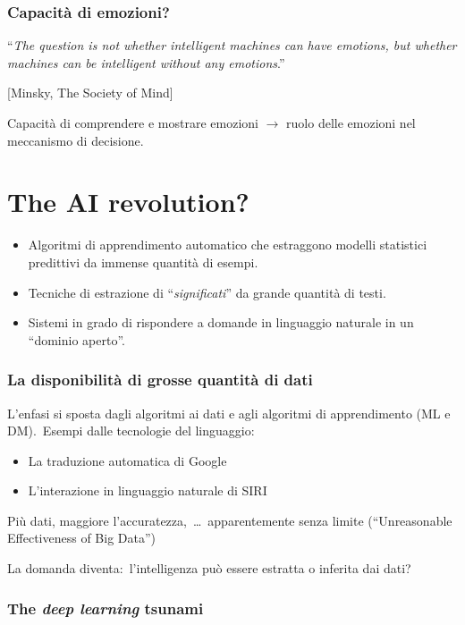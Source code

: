 \subsubsection{Capacità di emozioni?}

\begin{center}
	``\textit{The question is not whether intelligent machines can have emotions, but whether machines can be intelligent without any emotions}.''

	[Minsky, The Society of Mind]

\end{center}
Capacità di comprendere e mostrare emozioni $\rightarrow$ ruolo delle emozioni nel meccanismo di decisione.

\section{The AI revolution?}

\begin{itemize}
	\item Algoritmi di apprendimento automatico che estraggono modelli statistici predittivi da immense quantità di esempi.
	\item Tecniche di estrazione di ``\textit{significati}'' da grande quantità di testi.
	\item Sistemi in grado di rispondere a domande in linguaggio naturale in un ``dominio aperto''.
\end{itemize}

\subsubsection{La disponibilità di grosse quantità di dati}
L'enfasi si sposta dagli algoritmi ai dati e agli algoritmi di apprendimento (ML e DM).\
Esempi dalle tecnologie del linguaggio:
\begin{itemize}
	\item La traduzione automatica di Google
	\item L'interazione in linguaggio naturale di SIRI
\end{itemize}
Più dati, maggiore l'accuratezza,\ \dots\ apparentemente senza limite (``Unreasonable Effectiveness of Big Data'')

La domanda diventa:\ l'intelligenza può essere estratta o inferita dai dati?

\subsubsection{The \textit{deep learning} tsunami}


